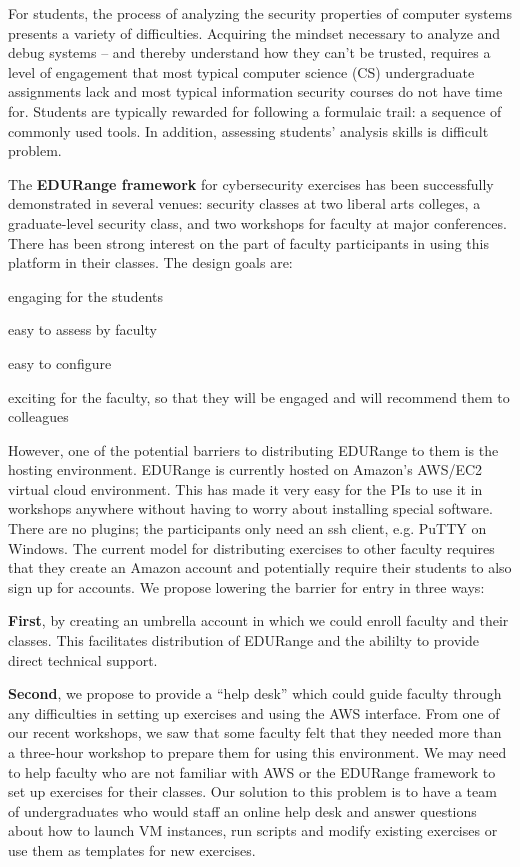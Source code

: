For students, the process of analyzing the security
properties of computer systems presents a variety of difficulties.
Acquiring the mindset necessary to analyze and debug systems -- and
thereby understand how they can't be trusted, requires a level
of engagement that most typical computer science (CS) undergraduate assignments lack and
most typical information security courses do not have time for.  
Students are typically rewarded for following a formulaic trail: a sequence
of commonly used tools.  In addition, assessing students' analysis skills is  difficult 
problem.


The {\bf EDURange framework} for cybersecurity exercises has been successfully demonstrated 
in several venues: security classes at two liberal arts colleges, a graduate-level security class, and
two workshops for faculty at major conferences.  There has been strong interest on the part of
faculty participants in using this platform in their classes.  The design goals are:
\begin{packenum}
\item engaging for the students
\item easy to assess by faculty
\item easy to configure
\item exciting for the faculty, so that they will be engaged and will recommend them
  to colleagues
\end{packenum}

However, one of the potential barriers to distributing EDURange to them is the hosting environment.
EDURange is currently hosted on
Amazon's AWS/EC2 virtual cloud environment.  This has made it very easy for the PIs to use it in 
workshops anywhere without having to worry about installing special software.  There are no plugins;
the participants only need an ssh client, e.g. PuTTY on Windows.  The current 
model for distributing
exercises to other faculty requires that they create an Amazon account and potentially require their students
to also sign up for accounts.  We propose lowering the barrier for entry in three ways:

{\bf First}, by creating an umbrella account in 
which we could enroll faculty and their classes.  This facilitates distribution of EDURange
and the abililty to provide direct 
technical support.  

{\bf Second},
we propose to provide a ``help desk'' which could guide faculty through any difficulties in setting up 
exercises and using the AWS interface.  From one of our recent workshops, we saw that 
some faculty felt that they needed more than a three-hour workshop to prepare them for using this
environment.  We may need to help faculty who are not familiar with AWS or the EDURange
framework  to set up exercises 
for their classes.  Our solution to this problem is  to have a team of undergraduates who would staff 
an online help desk
and answer questions about how to launch VM instances, run scripts and modify existing exercises or use them as 
templates for new exercises.

